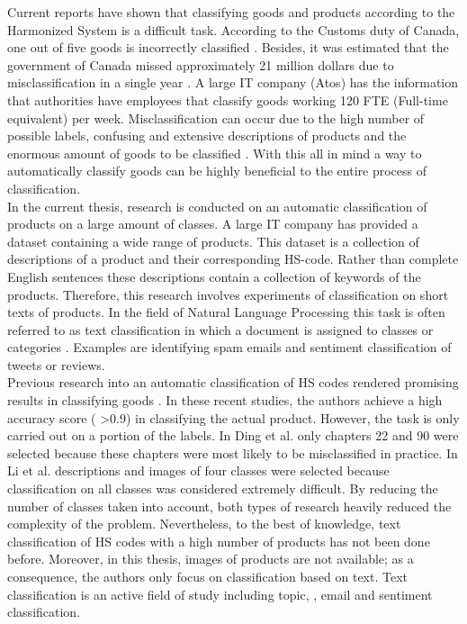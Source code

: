 Current reports have shown that classifying goods and products according to the Harmonized System is a difficult task. According to the Customs duty of Canada, one out of five goods is incorrectly classified \cite{AuditorGeneralofCanada2017}. Besides, it was estimated that the government of Canada missed approximately 21 million dollars due to misclassification in a single year \cite{AuditorGeneralofCanada2017}. A large IT company (Atos) has the information that authorities have employees that classify goods working 120 FTE (Full-time equivalent) per week. Misclassification can occur due to the high number of possible labels, confusing and extensive descriptions of products and the enormous amount of goods to be classified \cite{Kappler2011a}. With this all in mind a way to automatically classify goods can be highly beneficial to the entire process of classification.\\

In the current thesis, research is conducted on an automatic classification of products on a large amount of classes. A large IT company has provided a dataset containing a wide range of products. This dataset is a collection of descriptions of a product and their corresponding HS-code. Rather than complete English sentences these descriptions contain a collection of keywords of the products. Therefore, this research involves experiments of classification on short texts of products. In the field of Natural Language Processing this task is often referred to as text classification in which a document is assigned to classes or categories \cite{Manning2008}. Examples are identifying spam emails and sentiment classification of tweets or reviews.\\

Previous research into an automatic classification of HS codes rendered promising results in classifying goods \cite{Ding2015} \cite{Li2019}. In these recent studies, the authors achieve a high accuracy score ( \textgreater 0.9) in classifying the actual product. However, the task is only carried out on a portion of the labels. In Ding et al. \cite{Ding2015} only chapters 22 and 90 were selected because these chapters were most likely to be misclassified in practice. In Li et al. \cite{Li2019} descriptions and images of four classes were selected because classification on all classes was considered extremely difficult. By reducing the number of classes taken into account, both types of research heavily reduced the complexity of the problem. Nevertheless, to the best of knowledge, text classification of HS codes with a high number of products has not been done before. Moreover, in this thesis, images of products are not available; as a consequence, the authors only focus on classification based on text. Text classification is an active field of study including topic, \cite{Liu2016}, email \cite{7921698} and sentiment \cite{doi:10.1146/annurev-linguistics-011415-040518} classification. 

